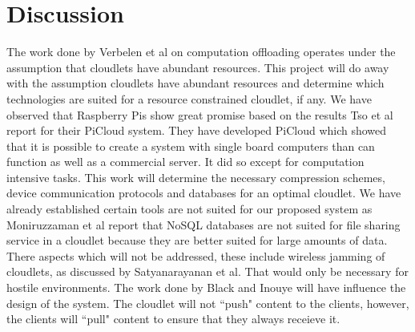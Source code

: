 \section{Discussion}
The work done by Verbelen et al\cite{RefWorks:93} on computation offloading operates under the assumption that cloudlets have abundant resources.
This project will do away with the assumption cloudlets have abundant resources and determine which technologies are suited for a resource constrained cloudlet, if any. We have observed that Raspberry Pis show great promise based on the results Tso et al\cite{tso2013glasgow} report for their PiCloud system. They have developed PiCloud which showed that it is possible to create a system with single board computers than can function as well as a commercial server. It did so except for computation intensive tasks. This work will determine the necessary compression schemes, device communication protocols and databases for an optimal cloudlet. We have already established certain tools are not suited for our proposed system as Moniruzzaman et al\cite{RefWorks:100} report that NoSQL databases are not suited for file sharing service in a cloudlet because they are better suited for large amounts of data. There aspects which will not be addressed, these include wireless jamming of cloudlets, as discussed by Satyanarayanan et al\cite{RefWorks:107}. That would only be necessary for hostile environments. The work done by Black and Inouye\cite{black1996system} will have influence the design of the system. The cloudlet will not ``push" content to the clients, however, the clients will ``pull" content to ensure that they always receieve it.